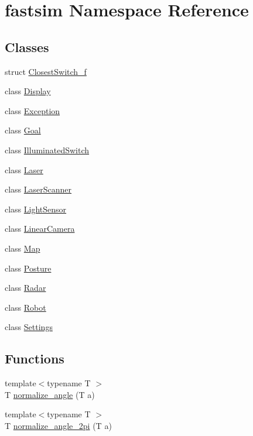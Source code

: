 \hypertarget{namespacefastsim}{}\section{fastsim Namespace Reference}
\label{namespacefastsim}
\subsection*{Classes}
\begin{DoxyCompactItemize}
\item 
struct \hyperlink{structfastsim_1_1_closest_switch__f}{Closest\+Switch\+\_\+f}
\item 
class \hyperlink{classfastsim_1_1_display}{Display}
\item 
class \hyperlink{classfastsim_1_1_exception}{Exception}
\item 
class \hyperlink{classfastsim_1_1_goal}{Goal}
\item 
class \hyperlink{classfastsim_1_1_illuminated_switch}{Illuminated\+Switch}
\item 
class \hyperlink{classfastsim_1_1_laser}{Laser}
\item 
class \hyperlink{classfastsim_1_1_laser_scanner}{Laser\+Scanner}
\item 
class \hyperlink{classfastsim_1_1_light_sensor}{Light\+Sensor}
\item 
class \hyperlink{classfastsim_1_1_linear_camera}{Linear\+Camera}
\item 
class \hyperlink{classfastsim_1_1_map}{Map}
\item 
class \hyperlink{classfastsim_1_1_posture}{Posture}
\item 
class \hyperlink{classfastsim_1_1_radar}{Radar}
\item 
class \hyperlink{classfastsim_1_1_robot}{Robot}
\item 
class \hyperlink{classfastsim_1_1_settings}{Settings}
\end{DoxyCompactItemize}
\subsection*{Functions}
\begin{DoxyCompactItemize}
\item 
{\footnotesize template$<$typename T $>$ }\\T \hyperlink{namespacefastsim_aea1edbf1975c6234ffa1efa8127cd943}{normalize\+\_\+angle} (T a)
\item 
{\footnotesize template$<$typename T $>$ }\\T \hyperlink{namespacefastsim_ab261030c0c53e5ab985bc773b45eae2d}{normalize\+\_\+angle\+\_\+2pi} (T a)
\end{DoxyCompactItemize}


